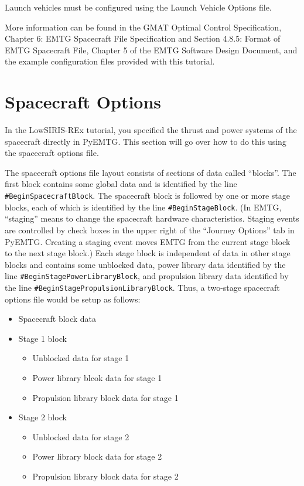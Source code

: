 \documentclass[11pt]{article}
\begin{document}
\noindent Launch vehicles must be configured using the Launch Vehicle Options file.

\noindent More information can be found in the \ac{GMAT} Optimal Control Specification, Chapter 6: \ac{EMTG} Spacecraft File Specification and Section 4.8.5: Format of \ac{EMTG} Spacecraft File, Chapter 5 of the \ac{EMTG} Software Design Document, and the example configuration files provided with this tutorial.

\section{Spacecraft Options}
\label{sec:spacecraft_options}

In the LowSIRIS-REx tutorial, you specified the thrust and power systems of the spacecraft directly in PyEMTG. This section will go over how to do this using the spacecraft options file. 
 
\noindent The spacecraft options file layout consists of sections of data called ``blocks''. The first block contains some global data and is identified by the line \texttt{\#BeginSpacecraftBlock}. The spacecraft block is followed by one or more stage blocks, each of which is identified by the line \texttt{\#BeginStageBlock}. (In \ac{EMTG}, ``staging'' means to change the spacecraft hardware characteristics. Staging events are controlled by check boxes in the upper right of the ``Journey Options'' tab in PyEMTG. Creating a staging event moves \ac{EMTG} from the current stage block to the next stage block.) Each stage block is independent of data in other stage blocks and contains some unblocked data, power library data identified by the line \texttt{\#BeginStagePowerLibraryBlock}, and propulsion library data identified by the line \texttt{\#BeginStagePropulsionLibraryBlock}. Thus, a two-stage spacecraft options file would be setup as follows:

\begin{itemize}
	\item Spacecraft block data
	\item Stage 1 block
	\begin{itemize}
		\item Unblocked data for stage 1
		\item Power library blcok data for stage 1
		\item Propulsion library block data for stage 1
	\end{itemize}
	\item Stage 2 block
	\begin{itemize}
		\item Unblocked data for stage 2
		\item Power library block data for stage 2
		\item Propulsion library block data for stage 2
	\end{itemize}
\end{itemize}
\end{document}
